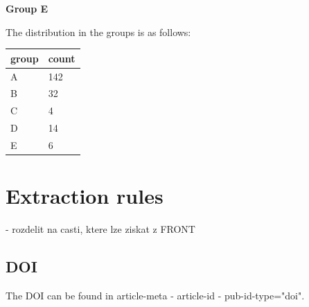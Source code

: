 \documentclass[12pt]{article}
\begin{document}
\textbf{Group E}


The distribution in the groups is as follows:

\begin{center}
    \begin{tabular}{| l | l |}
    \hline
    \textbf{group} & \textbf{count} \\
    \hline
    A & 142 \\ 
    B & 32 \\  
    C & 4 \\
    D & 14 \\
    E & 6 \\
    \hline
    \end{tabular}
\end{center}

\section{Extraction rules}

- rozdelit na casti, ktere lze ziskat z FRONT

\subsection{DOI}
The DOI can be found in article-meta - article-id - pub-id-type="doi".
\end{document}
